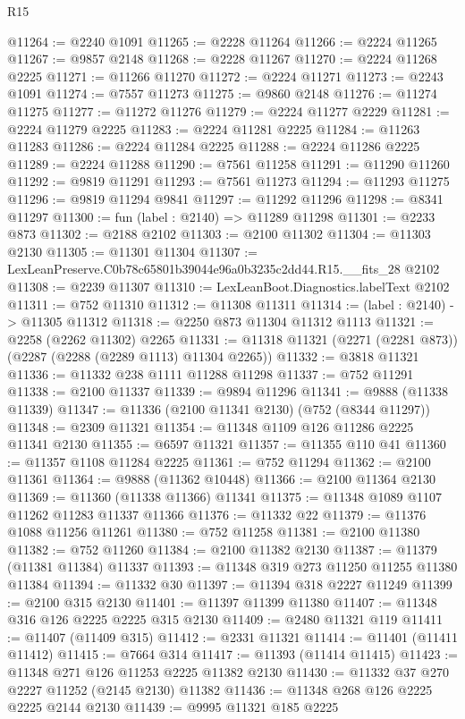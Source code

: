 \begin{lexlean}{R15}
\begin{coremodule}
@11264 := @2240 @1091
@11265 := @2228 @11264
@11266 := @2224 @11265
@11267 := @9857 @2148
@11268 := @2228 @11267
@11270 := @2224 @11268 @2225
@11271 := @11266 @11270
@11272 := @2224 @11271
@11273 := @2243 @1091
@11274 := @7557 @11273
@11275 := @9860 @2148
@11276 := @11274 @11275
@11277 := @11272 @11276
@11279 := @2224 @11277 @2229
@11281 := @2224 @11279 @2225
@11283 := @2224 @11281 @2225
@11284 := @11263 @11283
@11286 := @2224 @11284 @2225
@11288 := @2224 @11286 @2225
@11289 := @2224 @11288
@11290 := @7561 @11258
@11291 := @11290 @11260
@11292 := @9819 @11291
@11293 := @7561 @11273
@11294 := @11293 @11275
@11296 := @9819 @11294 @9841
@11297 := @11292 @11296
@11298 := @8341 @11297
@11300 := fun (label : @2140) => @11289 @11298
@11301 := @2233 @873
@11302 := @2188 @2102
@11303 := @2100 @11302
@11304 := @11303 @2130
@11305 := @11301 @11304
@11307 := LexLeanPreserve.C0b78c65801b39044e96a0b3235c2dd44.R15.__fits_28 @2102
@11308 := @2239 @11307
@11310 := LexLeanBoot.Diagnostics.labelText @2102
@11311 := @752 @11310
@11312 := @11308 @11311
@11314 := (label : @2140) -> @11305 @11312
@11318 := @2250 @873 @11304 @11312 @1113
@11321 := @2258 (@2262 @11302) @2265
@11331 := @11318 @11321 (@2271 (@2281 @873)) (@2287 (@2288 (@2289 @1113) @11304 @2265))
@11332 := @3818 @11321
@11336 := @11332 @238 @1111 @11288 @11298
@11337 := @752 @11291
@11338 := @2100 @11337
@11339 := @9894 @11296
@11341 := @9888 (@11338 @11339)
@11347 := @11336 (@2100 @11341 @2130) (@752 (@8344 @11297))
@11348 := @2309 @11321
@11354 := @11348 @1109 @126 @11286 @2225 @11341 @2130
@11355 := @6597 @11321
@11357 := @11355 @110 @41
@11360 := @11357 @1108 @11284 @2225
@11361 := @752 @11294
@11362 := @2100 @11361
@11364 := @9888 (@11362 @10448)
@11366 := @2100 @11364 @2130
@11369 := @11360 (@11338 @11366) @11341
@11375 := @11348 @1089 @1107 @11262 @11283 @11337 @11366
@11376 := @11332 @22
@11379 := @11376 @1088 @11256 @11261
@11380 := @752 @11258
@11381 := @2100 @11380
@11382 := @752 @11260
@11384 := @2100 @11382 @2130
@11387 := @11379 (@11381 @11384) @11337
@11393 := @11348 @319 @273 @11250 @11255 @11380 @11384
@11394 := @11332 @30
@11397 := @11394 @318 @2227 @11249
@11399 := @2100 @315 @2130
@11401 := @11397 @11399 @11380
@11407 := @11348 @316 @126 @2225 @2225 @315 @2130
@11409 := @2480 @11321 @119
@11411 := @11407 (@11409 @315)
@11412 := @2331 @11321
@11414 := @11401 (@11411 @11412)
@11415 := @7664 @314
@11417 := @11393 (@11414 @11415)
@11423 := @11348 @271 @126 @11253 @2225 @11382 @2130
@11430 := @11332 @37 @270 @2227 @11252 (@2145 @2130) @11382
@11436 := @11348 @268 @126 @2225 @2225 @2144 @2130
@11439 := @9995 @11321 @185 @2225

\end{coremodule}
\end{lexlean}
